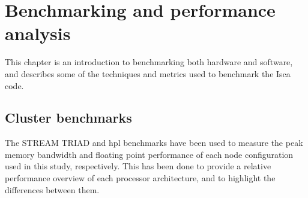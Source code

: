 \documentclass[a4paper,11pt]{report}
\begin{document}
\chapter{Benchmarking and performance analysis}
This chapter is an introduction to benchmarking both hardware and software, and describes some of the techniques and metrics used to benchmark the Isca code. 
\section{Cluster benchmarks}
\label{sec:cluster-bench}
The STREAM TRIAD and \gls{hpl} benchmarks have been used to measure the peak memory bandwidth and floating point performance of each node configuration used in this study, respectively. This has been done to provide a relative performance overview of each processor architecture, and to highlight the differences between them. 
\end{document}
